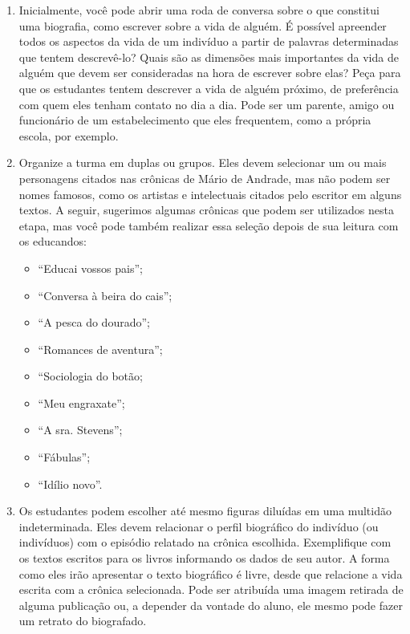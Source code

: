 \documentclass[12pt]{extarticle}
\begin{document}
\begin{enumerate}

\item
Inicialmente, você pode abrir uma roda de
conversa sobre o que constitui uma biografia, como escrever sobre a vida
de alguém. É possível apreender todos os aspectos da vida de um
indivíduo a partir de palavras determinadas que tentem descrevê-lo?
Quais são as dimensões mais importantes da vida de alguém que devem ser
consideradas na hora de escrever sobre elas? Peça para que os estudantes
tentem descrever a vida de alguém próximo, de preferência com quem eles
tenham contato no dia a dia. Pode ser um parente, amigo ou funcionário
de um estabelecimento que eles frequentem, como a própria escola, por
exemplo.

\item
Organize a turma em duplas ou grupos. Eles devem selecionar um ou
mais personagens citados nas crônicas de Mário de Andrade, mas não podem ser
nomes famosos, como os artistas e intelectuais citados pelo escritor em
alguns textos. A seguir, sugerimos algumas crônicas que podem ser
utilizados nesta etapa, mas você pode também realizar essa seleção
depois de sua leitura com os educandos:

\begin{itemize}
\item
  ``Educai vossos pais'';
\item
  ``Conversa à beira do cais'';
\item
  ``A pesca do dourado'';
\item
  ``Romances de aventura'';
\item
  ``Sociologia do botão;
\item
  ``Meu engraxate'';
\item
  ``A sra. Stevens'';
\item
  ``Fábulas'';
\item
  ``Idílio novo''.
\end{itemize}

\item
Os estudantes podem escolher até mesmo figuras diluídas em uma
multidão indeterminada. Eles devem relacionar o perfil biográfico do
indivíduo (ou indivíduos) com o episódio relatado na crônica escolhida.
Exemplifique com os textos escritos para os livros informando os dados
de seu autor. A forma como eles irão apresentar o texto biográfico é
livre, desde que relacione a vida escrita com a crônica selecionada.
Pode ser atribuída uma imagem retirada de alguma publicação ou, a
depender da vontade do aluno, ele mesmo pode fazer um retrato do
biografado.
\end{enumerate}
\end{document}

